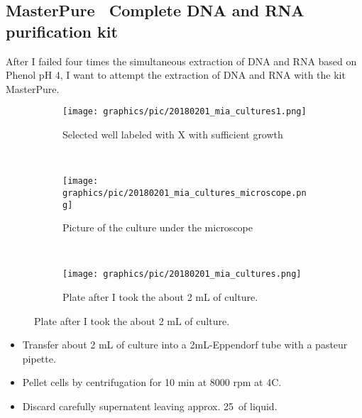 \subsection{MasterPure\texttrademark~ Complete DNA and RNA purification kit}
\label{task:20180201_cj4}

After I failed four times the simultaneous extraction of DNA and RNA based on Phenol pH 4, I want to attempt the extraction of DNA and RNA with the kit MasterPure\texttrademark.

\begin{figure}[H] %
    \centering
    \caption{Selection of the micro-algae culture for DNA and RNA extraction.}
    \label{fig:20180201_mia_cultures_selected}
    \begin{subfigure}[b]{0.3\textwidth}
        \texttt{[image: graphics/pic/20180201\_mia\_cultures1.png]}
        \caption{Selected well labeled with X with sufficient growth}
        \label{sfig:20180201_mia_cultures1}
    \end{subfigure}
    ~ 
    \begin{subfigure}[b]{0.3\textwidth}
        \texttt{[image: graphics/pic/20180201\_mia\_cultures\_microscope.png]}
        \caption{Picture of the culture under the microscope}
        \label{sfig:20180201_mia_cultures_microscope}
    \end{subfigure}
    ~ 
    \begin{subfigure}[b]{0.3\textwidth}
        \texttt{[image: graphics/pic/20180201\_mia\_cultures.png]}
        \caption{Plate after I took the about 2 mL of culture.}
        \label{sfig:20180201_mia_cultures}
    \end{subfigure}
\end{figure}

\begin{itemize}
\item Transfer about 2 mL of culture into a 2mL-Eppendorf tube with a pasteur pipette.
\item Pellet cells by centrifugation for 10 min at 8000 rpm at 4\degree C.
\item Discard carefully supernatent leaving approx. 25~\uL of liquid.
\end{itemize}


